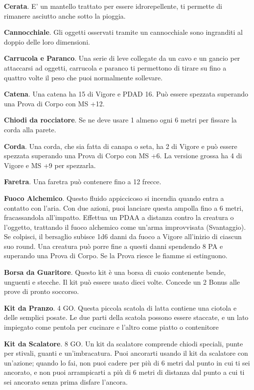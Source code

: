 \documentclass[12pt,a4paper,twoside,openany]{book}
\begin{document}
\begin{multicols}{2}
\textbf{Cerata}. E' un mantello trattato per essere idrorepellente, ti permette di rimanere asciutto anche sotto la pioggia.

\textbf{Cannocchiale}. Gli oggetti osservati tramite un cannocchiale sono ingranditi al doppio delle loro dimensioni.

\textbf{Carrucola e Paranco}. Una serie di leve collegate da un cavo e un gancio per attaccarsi ad oggetti, carrucola e paranco ti permettono di tirare su fino a quattro volte il
peso che puoi normalmente sollevare.

\textbf{Catena}. Una catena ha 15 di Vigore e PDAD 16. Può essere spezzata superando una Prova di Corpo con MS +12.

\textbf{Chiodi da rocciatore}. Se ne deve usare 1 almeno ogni 6 metri per fissare la corda alla parete.

\textbf{Corda}. Una corda, che sia fatta di canapa o seta, ha 2 di Vigore e può essere spezzata superando una Prova di Corpo con MS +6. La versione grossa ha 4 di Vigore e MS +9 per spezzarla.

\textbf{Faretra}. Una faretra può contenere fino a 12 frecce.

\textbf{Fuoco Alchemico}. Questo fluido appiccicoso si incendia quando entra a contatto con l’aria. Con due azioni, puoi lanciare questa ampolla fino a 6 metri, fracassandola all’impatto. Effettua un PDAA a distanza contro la creatura o l’oggetto, trattando il fuoco alchemico come un’arma improvvisata (Svantaggio). Se colpisci, il bersaglio subisce 1d6 danni da fuoco a Vigore all’inizio di ciascun suo round. Una creatura può porre fine a questi danni spendendo 8 PA e superando una Prova di Corpo. Se la Prova riesce le fiamme si estinguono.

\textbf{Borsa da Guaritore}. Questo kit è una borsa di cuoio contenente bende, unguenti e stecche. Il kit può essere usato dieci volte. Concede un 2 Bonus alle prove di pronto soccorso.

\textbf{Kit da Pranzo}. 4 GO. Questa piccola scatola di latta contiene una ciotola e delle semplici posate. Le due parti della scatola possono essere staccate, e un lato impiegato come pentola per cucinare e l’altro come piatto o contenitore

\textbf{Kit da Scalatore}. 8 GO. Un kit da scalatore comprende chiodi speciali, punte per stivali, guanti e un’imbracatura. Puoi ancorarti usando il kit da scalatore con un’azione; quando lo fai, non puoi cadere per più di 6 metri dal punto in cui ti sei ancorato, e non puoi arrampicarti a più di 6 metri di distanza dal punto a cui ti sei ancorato senza prima disfare l’ancora.


\end{multicols}
\end{document}
